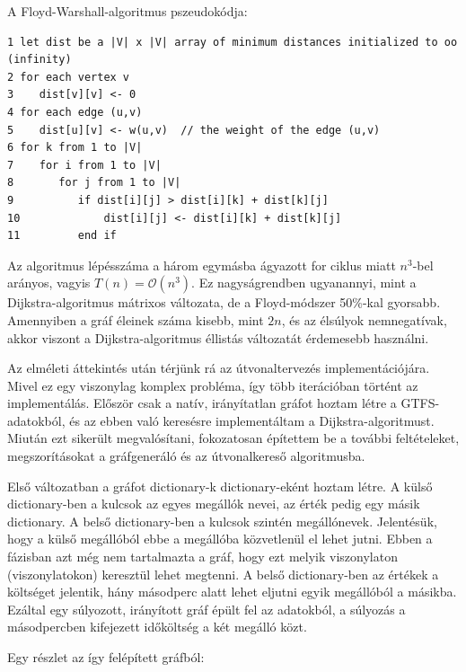A Floyd-Warshall-algoritmus pszeudokódja:


\begin{verbatim}
1 let dist be a |V| x |V| array of minimum distances initialized to oo (infinity)
2 for each vertex v
3    dist[v][v] <- 0
4 for each edge (u,v)
5    dist[u][v] <- w(u,v)  // the weight of the edge (u,v)
6 for k from 1 to |V|
7    for i from 1 to |V|
8       for j from 1 to |V|
9          if dist[i][j] > dist[i][k] + dist[k][j] 
10             dist[i][j] <- dist[i][k] + dist[k][j]
11         end if
\end{verbatim}

Az algoritmus lépésszáma a három egymásba ágyazott for ciklus miatt $n^3$-bel arányos, vagyis $T(n) = \mathcal{O}(n^3)$. Ez nagyságrendben ugyanannyi, mint a Dijkstra-algoritmus mátrixos változata, de a Floyd-módszer 50\%-kal gyorsabb. Amennyiben a gráf éleinek száma kisebb, mint $2n$, és az élsúlyok nemnegatívak, akkor viszont a Dijkstra-algoritmus éllistás változatát érdemesebb használni.


Az elméleti áttekintés után térjünk rá az útvonaltervezés implementációjára. Mivel ez egy viszonylag komplex probléma, így több iterációban történt az implementálás. Először csak a natív, irányítatlan gráfot hoztam létre a GTFS-adatokból, és az ebben való keresésre implementáltam a Dijkstra-algoritmust. Miután ezt sikerült megvalósítani, fokozatosan építettem be a további feltételeket, megszorításokat a gráfgeneráló és az útvonalkereső algoritmusba.

Első változatban a gráfot dictionary-k dic\-ti\-o\-na\-ry-eként hoztam létre. A külső dic\-ti\-o\-na\-ry-ben a kulcsok az egyes megállók nevei, az érték pedig egy másik dictionary. A belső dictionary-ben a kulcsok szintén megállónevek. Jelentésük, hogy a külső megállóból ebbe a megállóba közvetlenül el lehet jutni. Ebben a fázisban azt még nem tartalmazta a gráf, hogy ezt melyik viszonylaton (viszonylatokon) keresztül lehet megtenni. A belső dictionary-ben az értékek a költséget jelentik, hány másodperc alatt lehet eljutni egyik megállóból a másikba. Ezáltal egy súlyozott, irányított gráf épült fel az adatokból, a súlyozás a másodpercben kifejezett időköltség a két megálló közt.

Egy részlet az így felépített gráfból:

